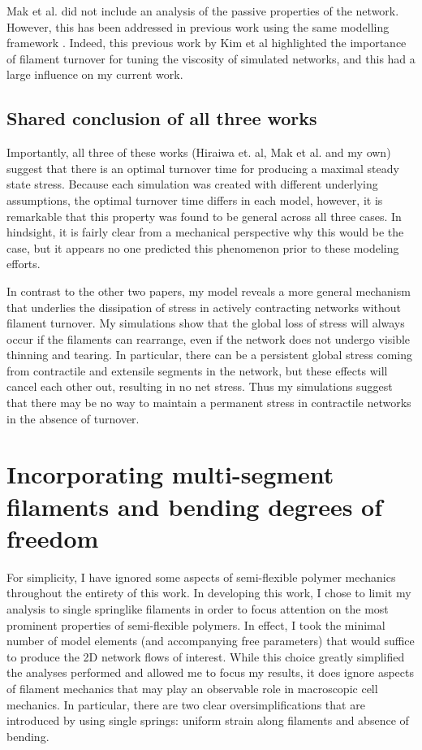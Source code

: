Mak et al. did not include an analysis of the passive properties of the network.  However, this has been addressed in  previous work using the same modelling framework \cite{Kim2014526}.  Indeed, this previous work by Kim et al highlighted  the importance of filament turnover for tuning the viscosity of simulated networks, and this had a large  influence on my current work.

\subsection{Shared conclusion of all three works}
Importantly, all three of these works (Hiraiwa et. al, Mak et al. and my own) suggest that there is an optimal turnover time for producing a maximal steady state stress.  Because each simulation was created with different underlying assumptions, the optimal turnover time differs in each model, however, it is remarkable that this property was found to be general across all three cases.  In hindsight, it is fairly clear from a mechanical perspective why this would be the case, but it appears no one predicted this phenomenon prior to these modeling efforts.

In contrast to the other two papers, my model reveals a more general mechanism that underlies  the dissipation of stress in actively contracting networks without filament turnover.  My simulations show that the global loss of stress will always occur if the filaments can rearrange, even if the network does not undergo visible thinning and tearing. In particular, there can be a persistent global stress coming from contractile and extensile segments in the network, but these effects will cancel each other out, resulting in no net stress.  Thus my simulations suggest that there may be no way to maintain a permanent stress in contractile networks in the absence of turnover.

\section{Incorporating multi-segment filaments and bending degrees of freedom}
For simplicity, I have ignored some aspects of semi-flexible polymer mechanics throughout the entirety of this work.  In developing this work, I chose to limit my analysis to single springlike filaments in order to focus attention on the most prominent properties of semi-flexible polymers. In effect, I took the minimal number of model elements (and accompanying free parameters) that would suffice to produce the 2D network flows of interest. While this choice greatly simplified the analyses performed and allowed me to focus my results, it does ignore aspects of filament mechanics that may play an observable role in macroscopic cell mechanics.  In particular, there are two clear oversimplifications that are introduced by using single springs: uniform strain along filaments and absence of bending.

